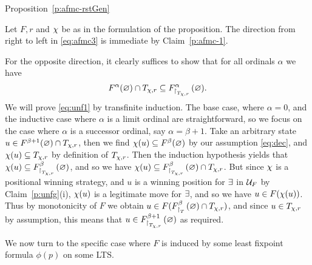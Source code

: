 \begin{proofof}{Proposition~\ref{p:afmc-rstGen}}
\begin{pfclaim}
Let $F,r$ and $\chi$ be as in the formulation of the proposition.
The direction from right to left in \eqref{eq:afmc3} is immediate by
Claim~\ref{p:afmc-1}.

For the opposite direction, it clearly suffices to show that for all ordinals 
$\alpha$ we have
\begin{equation}
\label{eq:unf1}
F^{\al}(\nada) \cap T_{\ystrat,r} \sse F_{\rst{T_{\ystrat,r}}}^{\alpha}(\nada).
\end{equation}
We will prove \eqref{eq:unf1} by transfinite induction.
The base case, where $\alpha = 0$, and the inductive case where $\alpha$ is a limit
ordinal are straightforward, so we focus on the case where $\alpha$ is a 
successor ordinal, say $\alpha = \beta +1$.
Take an arbitrary state $u \in F^{\beta+1}(\varnothing) \cap T_{\chi,r}$, then we find 
$\chi(u) \subseteq F^{\beta}(\varnothing)$ by our assumption \eqref{eq:dec}, and 
$\chi(u) \subseteq T_{\chi,r}$ by definition of $T_{\chi,r}$.
Then the induction hypothesis yields that 
$\chi(u) \subseteq F_{{\upharpoonright}_{T_{\chi,r}}\,}^{\beta}(\varnothing)$, and so we have 
$\chi(u) \subseteq F_{{\upharpoonright}_{T_{\chi,r}}\,}^{\beta}(\varnothing) \cap T_{\chi,r}$.
But since $\chi$ is a positional winning strategy, and $u$ is a winning position
for $\exists$ in $\mathcal{U}_{F}$ by Claim~\ref{p:unfg}(i), $\chi(u)$ is a
legitimate move for $\exists$, and so we have $u \in F(\chi(u))$.
Thus by monotonicity of $F$ we obtain $u \in 
F(F_{{\upharpoonright}_{T}\,}^{\beta}(\varnothing) \cap T_{\chi,r})$, and since $u \in T_{\chi,r}$ by assumption, this
means that $u \in F_{{\upharpoonright}_{T_{\chi,r}}\,}^{\beta+1}(\varnothing)$ as required.
\end{pfclaim}

We now turn to the specific case where $F$ is induced by some least fixpoint formula 
$\phi(p)$ on some LTS.



\end{proofof}
